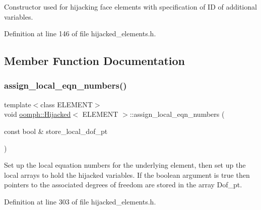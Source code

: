 Constructor used for hijacking face elements with specification of ID of additional variables. 



Definition at line 146 of file hijacked\+\_\+elements.\+h.



\subsection{Member Function Documentation}
\mbox{\label{classoomph_1_1Hijacked_afd4a5578291487aa37b0931dab845701}} 
\subsubsection{\texorpdfstring{assign\+\_\+local\+\_\+eqn\+\_\+numbers()}{assign\_local\_eqn\_numbers()}}
{\footnotesize\ttfamily template$<$class E\+L\+E\+M\+E\+NT$>$ \\
void \hyperlink{classoomph_1_1Hijacked}{oomph\+::\+Hijacked}$<$ E\+L\+E\+M\+E\+NT $>$\+::assign\+\_\+local\+\_\+eqn\+\_\+numbers (\begin{DoxyParamCaption}\item[{const bool \&}]{store\+\_\+local\+\_\+dof\+\_\+pt }\end{DoxyParamCaption})\hspace{0.3cm}{\ttfamily [inline]}}



Set up the local equation numbers for the underlying element, then set up the local arrays to hold the hijacked variables. If the boolean argument is true then pointers to the associated degrees of freedom are stored in the array Dof\+\_\+pt. 



Definition at line 303 of file hijacked\+\_\+elements.\+h.

\mbox{\label{classoomph_1_1Hijacked_a35778dccc9cf036c37ee569efe5b5f7c}} 
